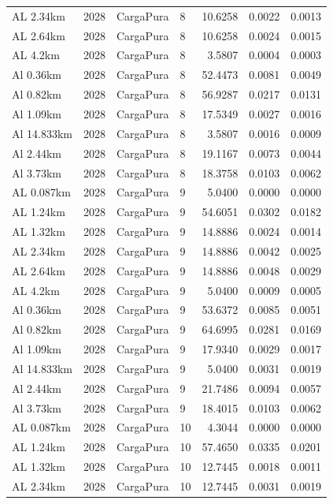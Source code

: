\documentclass[11pt,a4paper]{article}
\begin{document}
\begin{longtable}{llllrrr}
AL 2.34km & 2028 & CargaPura & 8 & 10.6258 & 0.0022 & 0.0013 \\
AL 2.64km & 2028 & CargaPura & 8 & 10.6258 & 0.0024 & 0.0015 \\
AL 4.2km & 2028 & CargaPura & 8 & 3.5807 & 0.0004 & 0.0003 \\
Al 0.36km & 2028 & CargaPura & 8 & 52.4473 & 0.0081 & 0.0049 \\
Al 0.82km & 2028 & CargaPura & 8 & 56.9287 & 0.0217 & 0.0131 \\
Al 1.09km & 2028 & CargaPura & 8 & 17.5349 & 0.0027 & 0.0016 \\
Al 14.833km & 2028 & CargaPura & 8 & 3.5807 & 0.0016 & 0.0009 \\
Al 2.44km & 2028 & CargaPura & 8 & 19.1167 & 0.0073 & 0.0044 \\
Al 3.73km & 2028 & CargaPura & 8 & 18.3758 & 0.0103 & 0.0062 \\
AL 0.087km & 2028 & CargaPura & 9 & 5.0400 & 0.0000 & 0.0000 \\
AL 1.24km & 2028 & CargaPura & 9 & 54.6051 & 0.0302 & 0.0182 \\
AL 1.32km & 2028 & CargaPura & 9 & 14.8886 & 0.0024 & 0.0014 \\
AL 2.34km & 2028 & CargaPura & 9 & 14.8886 & 0.0042 & 0.0025 \\
AL 2.64km & 2028 & CargaPura & 9 & 14.8886 & 0.0048 & 0.0029 \\
AL 4.2km & 2028 & CargaPura & 9 & 5.0400 & 0.0009 & 0.0005 \\
Al 0.36km & 2028 & CargaPura & 9 & 53.6372 & 0.0085 & 0.0051 \\
Al 0.82km & 2028 & CargaPura & 9 & 64.6995 & 0.0281 & 0.0169 \\
Al 1.09km & 2028 & CargaPura & 9 & 17.9340 & 0.0029 & 0.0017 \\
Al 14.833km & 2028 & CargaPura & 9 & 5.0400 & 0.0031 & 0.0019 \\
Al 2.44km & 2028 & CargaPura & 9 & 21.7486 & 0.0094 & 0.0057 \\
Al 3.73km & 2028 & CargaPura & 9 & 18.4015 & 0.0103 & 0.0062 \\
AL 0.087km & 2028 & CargaPura & 10 & 4.3044 & 0.0000 & 0.0000 \\
AL 1.24km & 2028 & CargaPura & 10 & 57.4650 & 0.0335 & 0.0201 \\
AL 1.32km & 2028 & CargaPura & 10 & 12.7445 & 0.0018 & 0.0011 \\
AL 2.34km & 2028 & CargaPura & 10 & 12.7445 & 0.0031 & 0.0019 \\

\end{longtable}
\end{document}
